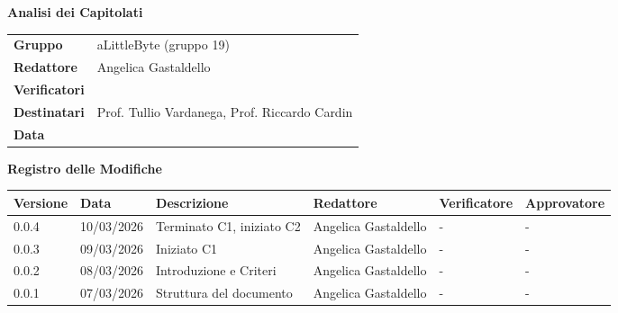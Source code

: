 \documentclass[a4paper,12pt]{article}
\begin{document}
\thispagestyle{firstpage}

\vspace*{0.5cm}

\begin{center}
    {\LARGE \textbf{Analisi dei Capitolati}}
\end{center}

\vspace{1.5cm}

\begin{center}
    \renewcommand{\arraystretch}{1.3}
    \begin{tcolorbox}[
        width=0.92\textwidth,
        colback=gray!6,
        colframe=gray!45,
        boxrule=0.5pt,
        arc=2mm,
        boxsep=0pt,
        left=8pt, right=8pt, top=8pt, bottom=8pt
    ]
        \begin{tabularx}{\linewidth}{>{\bfseries}p{3.5cm} X}
            Gruppo      & aLittleByte (gruppo 19) \\
            Redattore   & Angelica Gastaldello \\
            Verificatori& \\
            Destinatari & Prof. Tullio Vardanega, Prof. Riccardo Cardin \\
            Data        & \\
        \end{tabularx}
    \end{tcolorbox}
\end{center}

\newpage


\begin{center}
    {\Large \textbf{Registro delle Modifiche}}
\end{center}

\vspace{0.35cm}

\renewcommand{\arraystretch}{1.35}
\begin{center}
    {\footnotesize
    \begin{tabularx}{\textwidth}{|p{1.4cm}|p{1.8cm}|X|p{2.4cm}|p{2.3cm}|p{2.3cm}|}
        \hline
        \rowcolor{gray!20}
        \textbf{Versione} & \textbf{Data} & \textbf{Descrizione} & \textbf{Redattore} & \textbf{Verificatore} & \textbf{Approvatore} \\
        \hline
        0.0.4 & 10/03/2026 & Terminato C1, iniziato C2 & Angelica Gastaldello & - & - \\
        \hline
        0.0.3 & 09/03/2026 & Iniziato C1 & Angelica Gastaldello & - & - \\
        \hline
        0.0.2 & 08/03/2026 & Introduzione e Criteri & Angelica Gastaldello & - & - \\
        \hline
        0.0.1 & 07/03/2026 & Struttura del documento & Angelica Gastaldello & - & - \\
        \hline
    \end{tabularx}
    }
\end{center}
\end{document}
